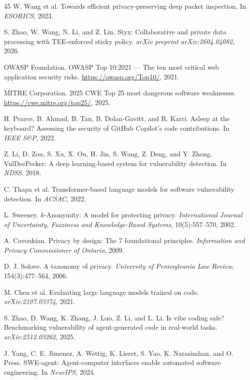 \documentclass[runningheads]{llncs}
\begin{document}
\begin{thebibliography}{45}
 W. Wang et al. Towards efficient privacy-preserving deep packet inspection. In \emph{ESORICS}, 2023.

 S. Zhao, W. Wang, N. Li, and Z. Lin. Styx: Collaborative and private data processing with TEE-enforced sticky policy. \emph{arXiv preprint arXiv:2604.04082}, 2026.

 OWASP Foundation. OWASP Top 10:2021 --- The ten most critical web application security risks. \url{https://owasp.org/Top10/}, 2021.

 MITRE Corporation. 2025 CWE Top 25 most dangerous software weaknesses. \url{https://cwe.mitre.org/top25/}, 2025.

 H. Pearce, B. Ahmad, B. Tan, B. Dolan-Gavitt, and R. Karri. Asleep at the keyboard? Assessing the security of GitHub Copilot's code contributions. In \emph{IEEE S\&P}, 2022.

 Z. Li, D. Zou, S. Xu, X. Ou, H. Jin, S. Wang, Z. Deng, and Y. Zhong. VulDeePecker: A deep learning-based system for vulnerability detection. In \emph{NDSS}, 2018.

 C. Thapa et al. Transformer-based language models for software vulnerability detection. In \emph{ACSAC}, 2022.

 L. Sweeney. $k$-Anonymity: A model for protecting privacy. \emph{International Journal of Uncertainty, Fuzziness and Knowledge-Based Systems}, 10(5):557--570, 2002.

 A. Cavoukian. Privacy by design: The 7 foundational principles. \emph{Information and Privacy Commissioner of Ontario}, 2009.

 D. J. Solove. A taxonomy of privacy. \emph{University of Pennsylvania Law Review}, 154(3):477--564, 2006.

 M. Chen et al. Evaluating large language models trained on code. \emph{arXiv:2107.03374}, 2021.

 S. Zhao, D. Wang, K. Zhang, J. Luo, Z. Li, and L. Li. Is vibe coding safe? Benchmarking vulnerability of agent-generated code in real-world tasks. \emph{arXiv:2512.03262}, 2025.

 J. Yang, C. E. Jimenez, A. Wettig, K. Lieret, S. Yao, K. Narasimhan, and O. Press. SWE-agent: Agent-computer interfaces enable automated software engineering. In \emph{NeurIPS}, 2024.


\end{thebibliography}
\end{document}

